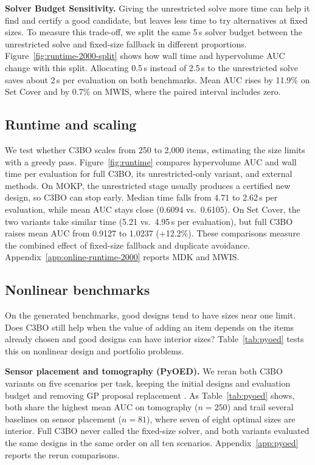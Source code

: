 \documentclass{article}
\newcommand{\revtext}[1]{{\color{blue}#1}}
\theoremstyle{remark}\newtheorem{remark}[proposition]{Remark}
\begin{document}
\revtext{\textbf{Solver Budget Sensitivity.} Giving the unrestricted solve more time can help it find and certify a good candidate, but leaves less time to try alternatives at fixed sizes. To measure this trade-off, we split the same 5\,s solver budget between the unrestricted solve and fixed-size fallback in different proportions. Figure~\ref{fig:runtime-2000-split} shows how wall time and hypervolume AUC change with this split. Allocating 0.5\,s instead of 2.5\,s to the unrestricted solve saves about 2\,s per evaluation on both benchmarks. Mean AUC rises by 11.9\% on Set Cover and by 0.7\% on MWIS, where the paired interval includes zero.}

\subsection{\revtext{Runtime and scaling}}\label{sec:runtime}

\revtext{We test whether C3BO scales from 250 to 2,000 items, estimating the size limits with a greedy pass. Figure~\ref{fig:runtime} compares hypervolume AUC and wall time per evaluation for full C3BO, its unrestricted-only variant, and external methods. On MOKP, the unrestricted stage usually produces a certified new design, so C3BO can stop early. Median time falls from 4.71 to 2.62\,s per evaluation, while mean AUC stays close (0.6094 vs.\ 0.6105). On Set Cover, the two variants take similar time (5.21 vs.\ 4.95\,s per evaluation), but full C3BO raises mean AUC from 0.9127 to 1.0237 (+12.2\%). These comparisons measure the combined effect of fixed-size fallback and duplicate avoidance. Appendix~\ref{app:online-runtime-2000} reports MDK and MWIS.}

\subsection{\revtext{Nonlinear benchmarks}}\label{sec:beyond}


\revtext{On the generated benchmarks, good designs tend to have sizes near one limit. Does C3BO still help when the value of adding an item depends on the items already chosen and good designs can have interior sizes? Table~\ref{tab:pyoed} tests this on nonlinear design and portfolio problems.}

\revtext{\textbf{Sensor placement and tomography (PyOED).} We reran both C3BO variants on five scenarios per task, keeping the initial designs and evaluation budget and removing GP proposal replacement \citep{chowdhary2025pyoed}. As Table~\ref{tab:pyoed} shows, both share the highest mean AUC on tomography ($n=250$) and trail several baselines on sensor placement ($n=81$), where seven of eight optimal sizes are interior. Full C3BO never called the fixed-size solver, and both variants evaluated the same designs in the same order on all ten scenarios. Appendix~\ref{app:pyoed} reports the rerun comparisons.}
\end{document}
